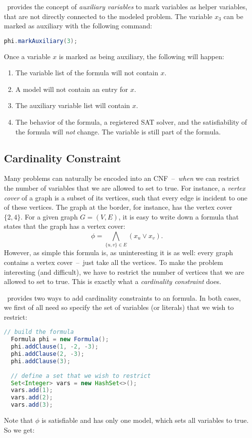 \documentclass[a4paper, ukenglish, twoside, openright]{jdrasilmanual}
\begin{document}
\Jdrasil\ provides the concept of \emph{auxiliary variables} to mark
variables as helper variables, that are not directly connected to the
modeled problem. The variable $x_3$ can be marked as auxiliary with the
following command:
\begin{lstlisting}[language=Java]
  phi.markAuxiliary(3);
\end{lstlisting}
Once a variable $x$ is marked as being auxiliary, the following will
happen:
\begin{enumerate}
  \item The variable list of the formula will not contain $x$.
  \item A model will not contain an entry for $x$.
  \item The auxiliary variable list will contain $x$.
  \item The behavior of the formula, a registered SAT solver, and the
    satisfiability of the formula will \emph{not} change. The variable
    is still part of the formula.
\end{enumerate}

\subsection{Cardinality Constraint}
Many problems can naturally be encoded into an CNF~–~\emph{when} we can
restrict the number of variables that we are allowed to set to
true. For instance, a \emph{vertex cover} of a graph is a subset of
its vertices, such that every edge is incident to one of these
vertices. The graph at the border, for instance, has the vertex cover $\{2,4\}$.
For a given graph $G=(V,E)$, it is easy to write down a formula that
states that the graph has a vertex cover:
\[
   \phi=\bigwedge_{\{u,v\}\in E}(x_u\vee x_v).
\]
However, as simple this formula is, as uninteresting it is as well:
every graph contains a vertex cover~–~just take all the vertices. To make
the problem interesting (and difficult), we have to restrict the
number of vertices that we are allowed to set to true. This is exactly
what a \emph{cardinality constraint} does.

\Jdrasil\ provides two ways to add cardinality constraints to an
formula. In both cases, we first of all need so specify the set of
variables (or literals) that we wish to restrict:
\begin{lstlisting}[language=Java]
  // build the formula
  Formula phi = new Formula();
  phi.addClause(1, -2, -3);
  phi.addClause(2, -3);
  phi.addClause(3);
  
  // define a set that we wish to restrict
  Set<Integer> vars = new HashSet<>();
  vars.add(1);
  vars.add(2);
  vars.add(3);
\end{lstlisting}
Note that $\phi$ is satisfiable and has only one model, which sets all
variables to true. So we get:
\end{document}
